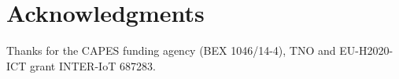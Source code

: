 \documentclass{sig-alternate-05-2015}
\begin{document}
\section{Acknowledgments}
Thanks for the CAPES funding agency (BEX 1046/14-4), TNO and EU-H2020-ICT grant INTER-IoT 687283.

%

%
%
\end{document}
